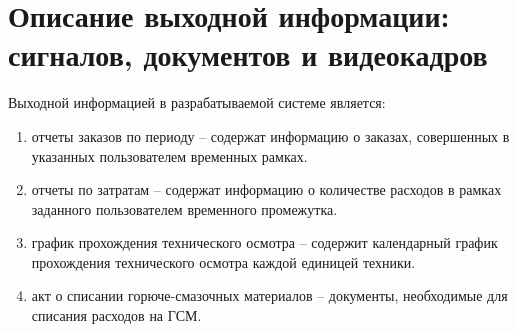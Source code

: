 \documentclass[../nirs.tex]{subfiles}
\begin{document}
\section{Описание выходной информации: сигналов, документов и видеокадров}
Выходной информацией в разрабатываемой системе является:
\begin{enumerate}
	\item отчеты заказов по периоду -- содержат информацию о заказах,
		совершенных в указанных пользователем временных рамках.
	\item отчеты по затратам -- содержат информацию о количестве расходов в
		рамках заданного пользователем временного промежутка.
	\item график прохождения технического осмотра -- содержит календарный график
		прохождения технического осмотра каждой единицей техники.
	\item акт о списании горюче-смазочных материалов -- документы,
		необходимые для списания расходов на ГСМ.
\end{enumerate}
\end{document}
